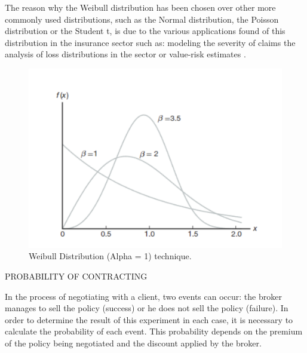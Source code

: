 \documentclass[review]{elsarticle}
\begin{document}
The reason why the Weibull distribution has been chosen over other more commonly used distributions, such as the Normal distribution, the Poisson distribution or the Student t, is due to the various applications found of this distribution in the insurance sector such as: modeling the severity of claims \cite{hamza2022weibull} the analysis of loss distributions in the sector \cite{ahmad2020modeling} or value-risk estimates \cite{gebizlioglu2011comparison}.
\begin{figure}[h]
\centering
\includegraphics[width=\linewidth]{images/b1.png}
\caption{\label{fig2}Weibull Distribution (Alpha = 1)
technique.} 
\end{figure}
PROBABILITY OF CONTRACTING

In the process of negotiating with a client, two events can occur: the broker manages to sell the policy (success) or he does not sell the policy (failure).
In order to determine the result of this experiment in each case, it is necessary to calculate the probability of each event. This probability depends on the premium of the policy being negotiated and the discount applied by the broker.
\end{document}
